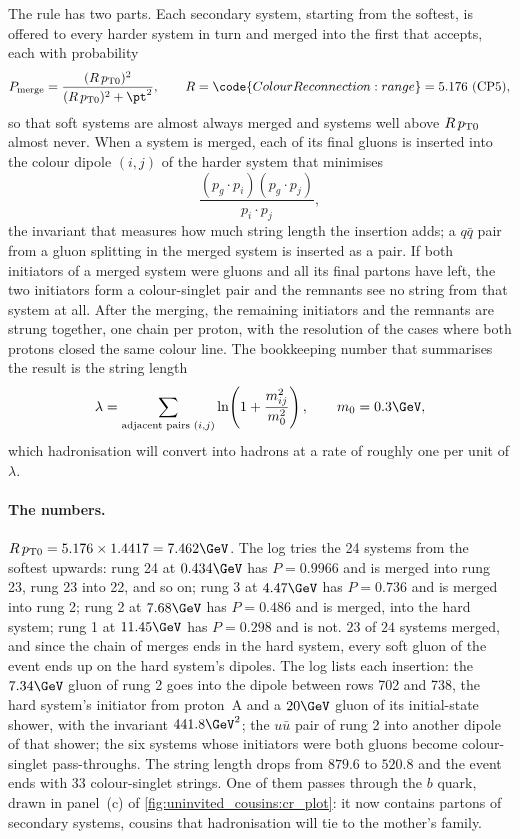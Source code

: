 The rule has two parts. Each secondary system, starting from the softest, is offered to every
harder system in turn and merged into the first that accepts, each with
probability
\begin{equation}
  P_{\mathrm{merge}}=\frac{(R\,\ptzero)^2}{(R\,\ptzero)^2+\pt^2},
  \qquad R=\code{ColourReconnection:range}=5.176\ \text{(CP5)},
  \label{eq:uninvited_cousins:cr_prob}
\end{equation}
so that soft systems are almost always merged and systems well above
$R\,p_{\mathrm{T}0}$ almost never. When a system is merged, each of its final
gluons is inserted into the colour dipole $(i,j)$ of the harder system
that minimises
\begin{equation}
  \frac{(p_g\cdot p_i)(p_g\cdot p_j)}{p_i\cdot p_j},
  \label{eq:uninvited_cousins:insertion}
\end{equation}
the invariant that measures how much string length the insertion adds; a
$q\bar q$ pair from a gluon splitting in the merged system is inserted as
a pair. If both initiators of a merged system were gluons and all its
final partons have left, the two initiators form a colour-singlet pair and
the remnants see no string from that system at all. After the merging, the
remaining initiators and the remnants are strung together, one chain per
proton, with the resolution of the cases where both protons closed the
same colour line. The bookkeeping number that summarises the result is the
string length
\begin{equation}
  \lambda=\sum_{\text{adjacent pairs }(i,j)}\ln\!\left(1+\frac{m_{ij}^2}{m_0^2}\right),
  \qquad m_0=0.3\GeV,
  \label{eq:uninvited_cousins:lambda}
\end{equation}
which hadronisation will convert into hadrons at a rate of roughly one per
unit of $\lambda$.

\paragraph{The numbers.} $R\,\ptzero=5.176\times1.4417=7.462\GeV$. The log
tries the 24 systems from the softest upwards: rung 24 at $0.434\GeV$ has
$P=0.9966$ and is merged into rung 23, rung 23 into 22, and so on; rung 3
at $4.47\GeV$ has $P=0.736$ and is merged into rung 2; rung 2 at $7.68\GeV$
has $P=0.486$ and is merged, into the hard system; rung 1 at $11.45\GeV$
has $P=0.298$ and is not. $23$ of $24$ systems merged, and since the chain
of merges ends in the hard system, every soft gluon of the event ends up on
the hard system's dipoles. The log lists each insertion: the $7.34\GeV$
gluon of rung 2 goes into the dipole between rows 702 and 738, the hard
system's initiator from proton~A and a $20\GeV$ gluon of its initial-state
shower, with the invariant $441.8\GeV^2$; the $u\bar u$ pair of rung 2
into another dipole of that shower; the six
systems whose initiators were both gluons become colour-singlet
pass-throughs. The string length drops from $879.6$ to $520.8$ and the
event ends with $33$ colour-singlet strings. One of them passes through the
$b$ quark, drawn in panel~(c) of \cref{fig:uninvited_cousins:cr_plot}: it
now contains partons of secondary systems, cousins that hadronisation will
tie to the mother's family.

